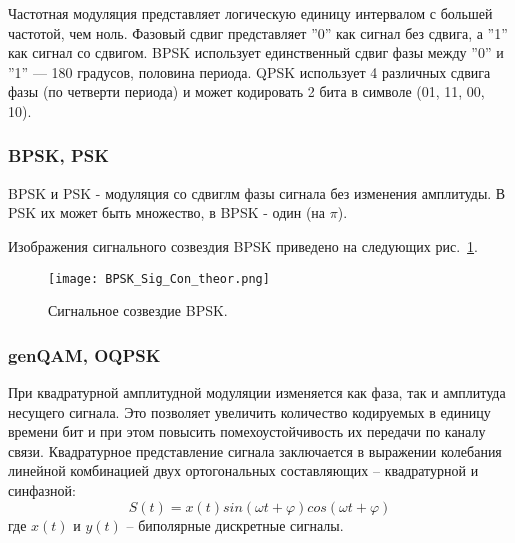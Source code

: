 Частотная модуляция представляет логическую единицу интервалом с большей частотой, чем ноль.
Фазовый сдвиг представляет ''0'' как сигнал без сдвига, а ''1'' как сигнал со сдвигом.
BPSK использует единственный сдвиг фазы между ''0'' и ''1'' — 180 градусов, половина периода.
QPSK использует 4 различных сдвига фазы (по четверти периода) и может кодировать 2 бита в символе (01, 11, 00, 10).

\subsubsection{BPSK, PSK}
BPSK и PSK - модуляция со сдвиглм фазы сигнала без изменения амплитуды. В PSK их может быть множество, в BPSK - один 
(на $\pi$).

Изображения сигнального созвездия BPSK приведено на следующих рис.~\ref{BPSK_Sig_Con_theor}.

\begin{figure}[H]
	\begin{center}
		\texttt{[image: BPSK\_Sig\_Con\_theor.png]}
		\caption{Сигнальное созвездие BPSK.} %
		\label{BPSK_Sig_Con_theor} %
	\end{center}
\end{figure}

\subsubsection{genQAM, OQPSK}
При квадратурной амплитудной модуляции изменяется как фаза, так и амплитуда несущего сигнала.
 Это позволяет увеличить количество кодируемых в единицу времени бит и при этом повысить помехоустойчивость их передачи по каналу связи. Квадратурное представление сигнала заключается в выражении колебания линейной комбинацией двух ортогональных составляющих – квадратурной и синфазной:
\begin{equation}
	S(t) = x(t) sin(\omega t + \varphi) cos(\omega t + \varphi)
\end{equation}
где $x(t)$ и $y(t)$ – биполярные дискретные сигналы.

